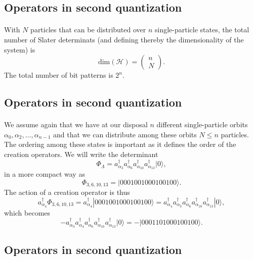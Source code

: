 \documentclass[%
twoside,                 %
final,                   %
10pt]{article}
\begin{document}
\subsection*{Operators in second quantization}

\paragraph{}
With $N$ particles that can be distributed over $n$ single-particle states, the total number of Slater determinats (and defining thereby the dimensionality of the system) is
\[
\mathrm{dim}(\mathcal{H}) = \left(\begin{array}{c} n \\N\end{array}\right).
\]
The total number of bit patterns is $2^n$.



\subsection*{Operators in second quantization}

\paragraph{}
We assume again that we have at our disposal $n$ different single-particle orbits
$\alpha_0,\alpha_2,\dots,\alpha_{n-1}$ and that we can distribute  among these orbits $N\le n$ particles.
The ordering among these states is important as it defines the order of the creation operators.
We will write the determinant 
\[
\Phi_{\Lambda} = a_{\alpha_3}^{\dagger} a_{\alpha_6}^{\dagger} a_{\alpha_{10}}^{\dagger} a_{\alpha_{13}}^{\dagger} |0\rangle,
\]
in a more compact way as 
\[
\Phi_{3,6,10,13} = |0001001000100100\rangle.
\]
The action of a creation operator is thus
\[
a^{\dagger}_{\alpha_4}\Phi_{3,6,10,13} = a^{\dagger}_{\alpha_4}|0001001000100100\rangle=a^{\dagger}_{\alpha_4}a_{\alpha_3}^{\dagger} a_{\alpha_6}^{\dagger} a_{\alpha_{10}}^{\dagger} a_{\alpha_{13}}^{\dagger} |0\rangle,
\]
which becomes
\[
-a_{\alpha_3}^{\dagger} a^{\dagger}_{\alpha_4} a_{\alpha_6}^{\dagger} a_{\alpha_{10}}^{\dagger} a_{\alpha_{13}}^{\dagger} |0\rangle=-|0001101000100100\rangle.
\]




\subsection*{Operators in second quantization}
\end{document}
